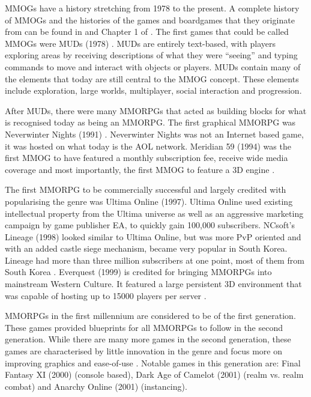 \documentclass[journal,oneside,a4paper,onecolumn]{IEEEtran}
\begin{document}
\acp{MMOG} have a history stretching from 1978 to the present. A complete history of \acp{MMOG} and the histories of the games and boardgames that they originate from can be found in \cite{mmog_past_present_future} and Chapter 1 of \cite{designing_virtual_worlds}. The first games that could be called \acp{MMOG} were \acp{MUD} (1978) \cite{mud_intro}. \acp{MUD} are entirely text-based, with players exploring areas by receiving descriptions of what they were ``seeing'' and typing commands to move and interact with objects or players. \acp{MUD} contain many of the elements that today are still central to the \ac{MMOG} concept. These elements include exploration, large worlds, multiplayer, social interaction and progression.

After \acp{MUD}, there were many \acp{MMORPG} that acted as building blocks for what is recognised today as being an \ac{MMORPG}. The first graphical \ac{MMORPG} was Neverwinter Nights (1991) \cite{nwn_aol}. Neverwinter Nights was not an Internet based game, it was hosted on what today is the AOL network. Meridian 59 (1994) was the first \ac{MMOG} to have featured a monthly subscription fee, receive wide media coverage and most importantly, the first \ac{MMOG} to feature a 3D engine \cite{meridian59_hist}.

The first \ac{MMORPG} to be commercially successful and largely credited with popularising the genre was Ultima Online (1997). Ultima Online used existing intellectual property from the Ultima universe as well as an aggressive marketing campaign by game publisher EA, to quickly gain 100,000 subscribers. NCsoft's Lineage (1998) looked similar to Ultima Online, but was more \ac{PvP} oriented and with an added castle siege mechanism, became very popular in South Korea. Lineage had more than three million subscribers at one point, most of them from South Korea \cite{mmog_subscriptions}. Everquest (1999) is credited for bringing \acp{MMORPG} into mainstream Western Culture. It featured a large persistent 3D environment that was capable of hosting up to 15000 players per server \cite{everquest2_capacity}.

\acp{MMORPG} in the first millennium are considered to be of the first generation. These games provided blueprints for all \acp{MMORPG}
to follow in the second generation. While there are many more games in the second generation, these games are characterised by little innovation
in the genre and focus more on improving graphics and ease-of-use \cite{mmog_past_present_future}. Notable games in this generation are: Final Fantasy XI (2000) (console based), Dark Age of Camelot (2001) (realm vs. realm combat) and Anarchy Online (2001) (instancing).
\end{document}
